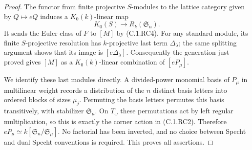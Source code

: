 \begin{proof}
The functor from finite projective $S$-modules to the lattice
category given by $Q\mapsto eQ$ induces a
$K_0(k)$-linear map
\[
 K_0(S)\longrightarrow R_k(\mathfrak S_n).
\]
It sends the Euler class of $F$ to $[M]$ by (C.1.RC4).
For any standard module, its finite $S$-projective resolution
has $k$-projective last term $\Delta_\lambda$; the same
splitting argument shows that its image is
$[e\Delta_\lambda]$.
Consequently the generation just proved gives $[M]$ as a
$K_0(k)$-linear combination of $[eP_\mu]$.

We identify these last modules directly.
A divided-power monomial basis of $P_\mu$ in multilinear
weight records a distribution of the $n$ distinct basis
letters into ordered blocks of sizes $\mu_j$.
Permuting the basis letters permutes this basis transitively,
with stabilizer $\mathfrak S_\mu$.
On $T_\omega$ these permutations act by left regular
multiplication, so this is exactly the corner action in
(C.1.RC2).  Therefore
$eP_\mu\simeq k[\mathfrak S_n/\mathfrak S_\mu]$.
No factorial has been inverted, and no choice between
Specht and dual Specht conventions is required.
This proves all assertions.
\end{proof}

